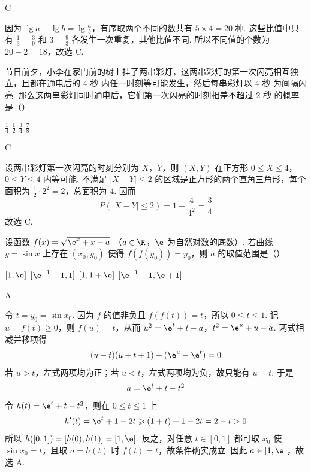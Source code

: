 \begin{answer}
C
\end{answer}

\begin{solution}
因为 \(\lg a-\lg b=\lg\frac{a}{b}\)，有序取两个不同的数共有 \(5\times4=20\) 种. 这些比值中只有
\(\frac{1}{3}=\frac{3}{9}\) 和 \(3=\frac{9}{3}\) 各发生一次重复，其他比值不同. 所以不同值的个数为 \(20-2=18\)，故选 C.
\end{solution}

\begin{problem}
节日前夕，小李在家门前的树上挂了两串彩灯，这两串彩灯的第一次闪亮相互独立，且都在通电后的 \(4\text{ 秒}\) 内任一时刻等可能发生，然后每串彩灯以 \(4\text{ 秒}\) 为间隔闪亮. 那么这两串彩灯同时通电后，它们第一次闪亮的时刻相差不超过 \(2\text{ 秒}\) 的概率是（\quad）

\choices
    {\(\frac{1}{4}\)}
    {\( \frac{1}{2} \)}
    {\( \frac{3}{4} \)}
    {\( \frac{7}{8} \)}
\end{problem}

\begin{answer}
C
\end{answer}

\begin{solution}
设两串彩灯第一次闪亮的时刻分别为 \(X\)，\(Y\)，则 \((X,Y)\) 在正方形 \(0\leqslant X\leqslant4\)，\(0\leqslant Y\leqslant4\) 内等可能. 不满足 \(|X-Y|\leqslant2\) 的区域是正方形的两个直角三角形，每个面积为 \(\frac12\cdot2^2=2\)，总面积为 \(4\). 因而
\[
P(|X-Y|\leqslant2)=1-\frac{4}{4^2}=\frac34
\]
故选 C.
\end{solution}

\begin{problem}
设函数 \( f(x) = \sqrt{\e^x + x - a} \) （\( a \in \R \)，\( \e \) 为自然对数的底数）. 若曲线 \( y = \sin x \) 上存在 \( (x_0, y_0) \) 使得 \( f(f(y_0)) = y_0 \)，则 \( a \) 的取值范围是（\quad）

\choices
    {\([1, \e]\)}
    {\([\e^{-1} - 1, 1]\)}
    {\([1, 1 + \e]\)}
    {\([\e^{-1} - 1, \e + 1]\)}
\end{problem}

\begin{answer}
A
\end{answer}

\begin{solution}
令 \(t=y_0=\sin x_0\). 因为 \(f\) 的值非负且 \(f(f(t))=t\)，所以 \(0\leqslant t\leqslant1\). 记 \(u=f(t)\geqslant0\)，则 \(f(u)=t\)，从而
\(u^2=\e^t+t-a\)，\(t^2=\e^u+u-a\).
两式相减并移项得
\[
(u-t)(u+t+1)+(\e^u-\e^t)=0
\]
若 \(u>t\)，左式两项均为正；若 \(u<t\)，左式两项均为负，故只能有 \(u=t\). 于是
\[
a=\e^t+t-t^2
\]
令 \(h(t)=\e^t+t-t^2\)，则在 \(0\leqslant t\leqslant1\) 上
\[
h'(t)=\e^t+1-2t\geqslant(1+t)+1-2t=2-t>0
\]
所以 \(h([0,1])=[h(0),h(1)]=[1,\e]\). 反之，对任意 \(t\in[0,1]\) 都可取 \(x_0\) 使 \(\sin x_0=t\)，且取 \(a=h(t)\) 时 \(f(t)=t\)，故条件确实成立. 因此 \(a\in[1,\e]\)，故选 A.
\end{solution}

